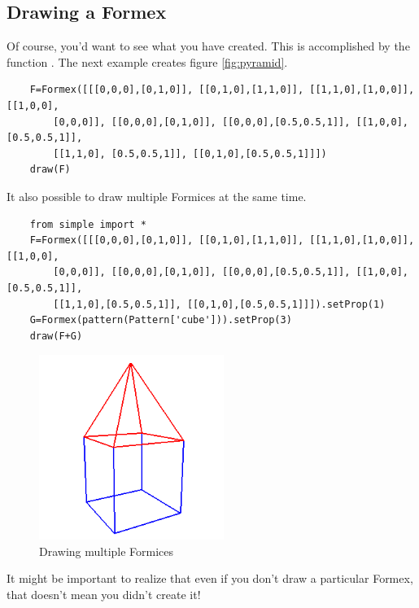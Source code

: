 \subsection{Drawing a Formex}
\label{subsec:drawing}
Of course, you'd want to see what you have created. This is accomplished by the function . The next example creates figure \ref{fig:pyramid}. 
\begin{verbatim}
	F=Formex([[[0,0,0],[0,1,0]], [[0,1,0],[1,1,0]], [[1,1,0],[1,0,0]], [[1,0,0], 
		[0,0,0]], [[0,0,0],[0,1,0]], [[0,0,0],[0.5,0.5,1]], [[1,0,0],[0.5,0.5,1]], 
		[[1,1,0], [0.5,0.5,1]], [[0,1,0],[0.5,0.5,1]]])
	draw(F)
\end{verbatim}

It also possible to draw multiple Formices at the same time.
\begin{verbatim}
	from simple import *
	F=Formex([[[0,0,0],[0,1,0]], [[0,1,0],[1,1,0]], [[1,1,0],[1,0,0]], [[1,0,0],
		[0,0,0]], [[0,0,0],[0,1,0]], [[0,0,0],[0.5,0.5,1]], [[1,0,0],[0.5,0.5,1]], 
		[[1,1,0],[0.5,0.5,1]], [[0,1,0],[0.5,0.5,1]]]).setProp(1)	
	G=Formex(pattern(Pattern['cube'])).setProp(3)
	draw(F+G)
\end{verbatim}
\begin{figure}[ht]
  \centering
  \begin{makeimage}
  \end{makeimage}
  \begin{latexonly}
    \includegraphics[width=6cm]{images/house}
  \end{latexonly}
  \begin{htmlonly}
  \end{htmlonly}  
  \caption{Drawing multiple Formices}
  \label{fig:multiple}
\end{figure}
 
It might be important to realize that even if you don't draw a particular Formex, that doesn't mean you didn't create it!

